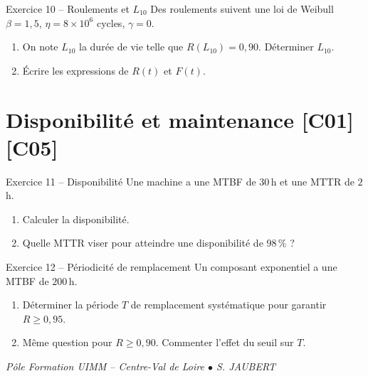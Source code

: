 \documentclass[a4paper,11pt]{article}
\begin{document}
\begin{exo}{Exercice 10 -- Roulements et $L_{10}$}
Des roulements suivent une loi de Weibull $\beta = 1{,}5$, $\eta = 8 \times 10^{6}$ cycles, $\gamma = 0$.
\begin{enumerate}[label=\alph*)]
  \item On note $L_{10}$ la durée de vie telle que $R(L_{10}) = 0{,}90$. Déterminer $L_{10}$.
  \item Écrire les expressions de $R(t)$ et $F(t)$.
\end{enumerate}
\end{exo}

\section{Disponibilité et maintenance \hfill {\normalsize\color{uimmred}[C01]\,[C05]}}

\begin{exo}{Exercice 11 -- Disponibilité}
Une machine a une MTBF de $30$\,h et une MTTR de $2$\,h.
\begin{enumerate}[label=\alph*)]
  \item Calculer la disponibilité.
  \item Quelle MTTR viser pour atteindre une disponibilité de $98\,\%$ ?
\end{enumerate}
\end{exo}

\begin{exo}{Exercice 12 -- Périodicité de remplacement}
Un composant exponentiel a une MTBF de $200$\,h.
\begin{enumerate}[label=\alph*)]
  \item Déterminer la période $T$ de remplacement systématique pour garantir $R \geq 0{,}95$.
  \item Même question pour $R \geq 0{,}90$. Commenter l'effet du seuil sur $T$.
\end{enumerate}
\end{exo}

\vfill
\begin{center}\color{uimmgray}\small
\textit{Pôle Formation UIMM -- Centre-Val de Loire $\bullet$ S. JAUBERT}
\end{center}
\end{document}
